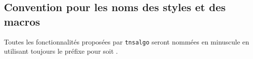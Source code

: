 \documentclass[12pt,a4paper]{article}
\begin{document}

\subsection{Convention pour les noms des styles et des macros}

Toutes les fonctionnalités proposées par \verb#tnsalgo# seront nommées en minuscule en utilisant toujours le préfixe  pour   soit .
\end{document}
